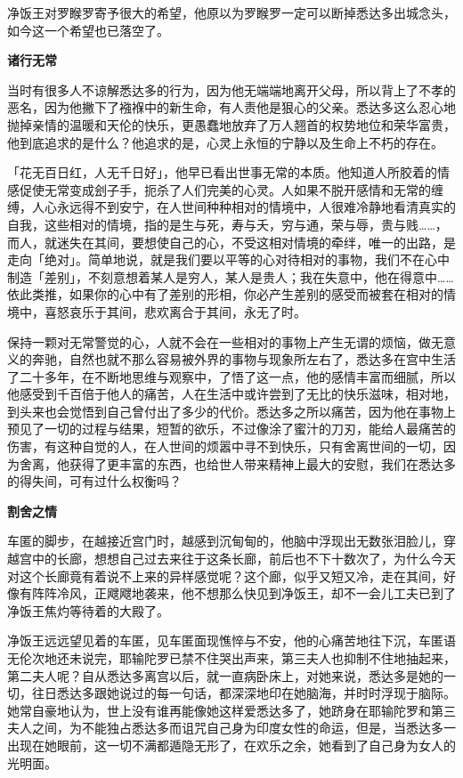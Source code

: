 \documentclass[twoside,openany]{book}
\newcommand{\mt}[1]{\textbullet \textbf{#1}}
\begin{document}
净饭王对罗睺罗寄予很大的希望，他原以为罗睺罗一定可以断掉悉达多出城念头，如今这一个希望也已落空了。

\mt{诸行无常}

当时有很多人不谅解悉达多的行为，因为他无端端地离开父母，所以背上了不孝的恶名，因为他撇下了襁褓中的新生命，有人责他是狠心的父亲。悉达多这么忍心地抛掉亲情的温暖和天伦的快乐，更愚蠢地放弃了万人翘首的权势地位和荣华富贵，他到底追求的是什么？他追求的是，心灵上永恒的宁静以及生命上不朽的存在。

「花无百日红，人无千日好」，他早已看出世事无常的本质。他知道人所胶着的情感促使无常变成刽子手，扼杀了人们完美的心灵。人如果不脱开感情和无常的缠缚，人心永远得不到安宁，在人世间种种相对的情境中，人很难冷静地看清真实的自我，这些相对的情境，指的是生与死，寿与夭，穷与通，荣与辱，贵与贱……，而人，就迷失在其间，要想使自己的心，不受这相对情境的牵绊，唯一的出路，是走向「绝对」。简单地说，就是我们要以平等的心对待相对的事物，我们不在心中制造「差别」，不刻意想着某人是穷人，某人是贵人；我在失意中，他在得意中……依此类推，如果你的心中有了差别的形相，你必产生差别的感受而被套在相对的情境中，喜怒哀乐于其间，悲欢离合于其间，永无了时。

保持一颗对无常警觉的心，人就不会在一些相对的事物上产生无谓的烦恼，做无意义的奔驰，自然也就不那么容易被外界的事物与现象所左右了，悉达多在宫中生活了二十多年，在不断地思维与观察中，了悟了这一点，他的感情丰富而细腻，所以他感受到千百倍于他人的痛苦，人在生活中或许尝到了无比的快乐滋味，相对地，到头来也会觉悟到自己曾付出了多少的代价。悉达多之所以痛苦，因为他在事物上预见了一切的过程与结果，短暂的欲乐，不过像涂了蜜汁的刀刃，能给人最痛苦的伤害，有这种自觉的人，在人世间的烦嚣中寻不到快乐，只有舍离世间的一切，因为舍离，他获得了更丰富的东西，也给世人带来精神上最大的安慰，我们在悉达多的得失间，可有过什么权衡吗？

\mt{割舍之情}

车匿的脚步，在越接近宫门时，越感到沉甸甸的，他脑中浮现出无数张泪脸儿，穿越宫中的长廊，想想自己过去来往于这条长廊，前后也不下十数次了，为什么今天对这个长廊竟有着说不上来的异样感觉呢？这个廊，似乎又短又冷，走在其间，好像有阵阵冷风，正飕飕地袭来，他不想那么快见到净饭王，却不一会儿工夫已到了净饭王焦灼等待着的大殿了。

净饭王远远望见着的车匿，见车匿面现憔悴与不安，他的心痛苦地往下沉，车匿语无伦次地还未说完，耶输陀罗已禁不住哭出声来，第三夫人也抑制不住地抽起来，第二夫人呢？自从悉达多离宫以后，就一直病卧床上，对她来说，悉达多是她的一切，往日悉达多跟她说过的每一句话，都深深地印在她脑海，并时时浮现于脑际。她常自豪地认为，世上没有谁再能像她这样爱悉达多了，她跻身在耶输陀罗和第三夫人之间，为不能独占悉达多而诅咒自己身为印度女性的命运，但是，当悉达多一出现在她眼前，这一切不满都遁隐无形了，在欢乐之余，她看到了自己身为女人的光明面。
\end{document}
